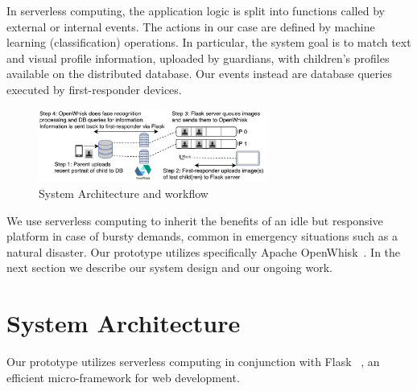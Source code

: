 \documentclass[sigconf]{acmart}
\begin{document}
\begin{titlepage}
In serverless computing, the application logic is split into functions called by external or internal events. 
%
The actions in our case are defined by machine learning (classification) operations. In particular, the system goal is to match text and visual profile information, uploaded by guardians, with children's profiles available on the distributed database.  Our events instead are database queries executed by first-responder devices.
%
\vspace*{-1mm}
\begin{figure}[t]
\begin{center}
\includegraphics[width=75mm, scale=1]{framework.pdf}
\vspace*{-5mm}
\caption{\footnotesize{System Architecture and workflow}
}
\label{figure1}
\end{center}
\vspace*{-6mm}
\end{figure}
%
We use serverless computing to inherit the benefits of an idle but responsive platform in case of bursty demands, common in emergency situations such as a natural disaster.
Our prototype utilizes specifically Apache OpenWhisk~\cite{openwhisk}.
%
In the next section we describe our system design and our ongoing work.


\section{System Architecture}
\label{sec:frame}

\vspace*{-4pt}
Our prototype utilizes serverless computing in conjunction with Flask ~\cite{flask}, an efficient micro-framework for web development.


\end{titlepage}
\end{document}
